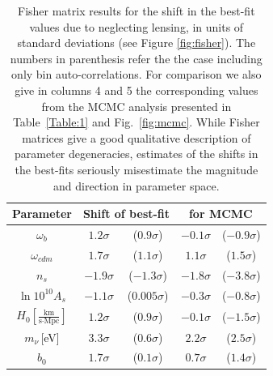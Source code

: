\begin{table}[!t]
  \centering
  \begin{tabular}{c|cccc}
    Parameter & \multicolumn{2}{c}{Shift of best-fit } &\multicolumn{2}{c}{for MCMC} \\
    \hline
       $\omega_b$ & $1.2\sigma$ & ($0.9\sigma$) & $-0.1\sigma$ & ($-0.9\sigma$)\\
   $\omega_{cdm}$ & $1.7\sigma$ & ($1.1\sigma$)& $1.1\sigma$ &
($1.5\sigma$)\\
   $n_s$      & $-1.9\sigma$ & ($-1.3\sigma$) & $-1.8\sigma$ &
($-3.8\sigma$) \\
   $\ln10^{10}A_s$ & $-1.1\sigma$ & ($0.005\sigma$)& $-0.3\sigma$ &
($-0.8\sigma$)\\
   $H_0\left[\frac{\text{km}}{\text{s}\cdot\text{Mpc}}\right]$ &
$1.2\sigma$ & ($0.9\sigma$)& $-0.1\sigma$ & ($-1.5\sigma$)\\
   $m_{\nu}$\,[eV]  & $3.3\sigma$ & ($0.6\sigma$)  & $2.2\sigma$ &
($2.5\sigma$)\\
   $b_0$      & $1.7\sigma$ & ($0.1\sigma$)   & $0.7\sigma$ &
($1.4\sigma$)\\
  \end{tabular}

  \caption{
      Fisher matrix results for the shift in the best-fit values due to neglecting lensing, in units of standard deviations (see Figure \ref{fig:fisher}). The numbers in parenthesis refer the the case including only bin auto-correlations. For comparison we also give in columns 4 and 5 the corresponding values from the MCMC analysis presented in Table~\ref{Table:1} and Fig.~\ref{fig:mcmc}. While Fisher matrices give a good qualitative description of parameter degeneracies, estimates of the shifts in the best-fits seriously misestimate the magnitude and direction in parameter space.
 }
  \label{Table:Fisher}
\end{table}

